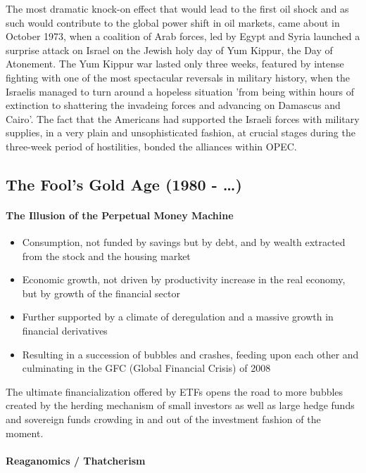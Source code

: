 The most dramatic knock-on effect that would lead to the first oil shock and
as such would contribute to the global power shift in oil markets, came about
in October 1973, when a coalition of Arab forces, led by Egypt and Syria
launched a surprise attack on Israel on the Jewish holy day of Yum Kippur,
the Day of Atonement. The Yum Kippur war lasted only three weeks, featured by
intense fighting with one of the most spectacular reversals in military
history, when the Israelis managed to turn around a hopeless situation 'from
being within hours of extinction to shattering the invadeing forces and advancing
on Damascus and Cairo'. The fact that the Americans had supported the Israeli
forces with military supplies, in a very plain and unsophisticated fashion, at
crucial stages during the three-week period of hostilities, bonded the alliances
within OPEC.


\subsection{The Fool's Gold Age (1980 - \dots)}

\paragraph{The Illusion of the Perpetual Money Machine}

\begin{itemize}
    \item Consumption, not funded by savings but by debt, and by wealth
        extracted from the stock and the housing market
    \item Economic growth, not driven by productivity increase in the real
        economy, but by growth of the financial sector
    \item Further supported by a climate of deregulation and a massive
        growth in financial derivatives
    \item Resulting in a succession of bubbles and crashes, feeding upon
        each other and culminating in the GFC (Global Financial Crisis) of
        2008
\end{itemize}

The ultimate financialization offered by ETFs opens the road to more
bubbles created by the herding mechanism of small investors as well
as large hedge funds and sovereign funds crowding in and out of the
investment fashion of the moment.

\paragraph{Reaganomics / Thatcherism}

